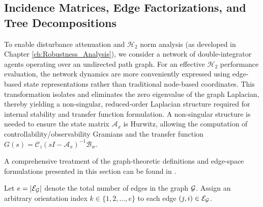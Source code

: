 \subsection{Incidence Matrices, Edge Factorizations, and Tree Decompositions}
To enable disturbance attenuation and $\mathcal{H}_2$ norm analysis (as developed in Chapter \ref{ch:Robustness_Analysis}), we consider a network of double-integrator agents operating over an undirected path graph. For an effective $\mathcal{H}_2$ performance evaluation, the network dynamics are more conveniently expressed using edge-based state representations rather than traditional node-based coordinates. This transformation isolates and eliminates the zero eigenvalue of the graph Laplacian, thereby yielding a non-singular, reduced-order Laplacian structure required for internal stability and transfer function formulation. A non-singular structure is needed to ensure the state matrix $\mathcal{A}_x$ is Hurwitz, allowing the computation of controllability/observability Gramians and the transfer function $G(s) = \mathcal{C}_z(sI - \mathcal{A}_x)^{-1}\mathcal{B}_w$.

A comprehensive treatment of the graph-theoretic definitions and edge-space formulations presented in this section can be found in \cite{zelazo2007agreement, zelazo2009h2, zelazo2010edge}.

Let $e = |{\mathcal{E}}_{\mathcal{G}}|$ denote the total number of edges in the graph $\mathcal{G}$. Assign an arbitrary orientation index $k \in \{1, 2, \dots, e\}$ to each edge $(j, i) \in {\mathcal{E}}_{\mathcal{G}}$.

